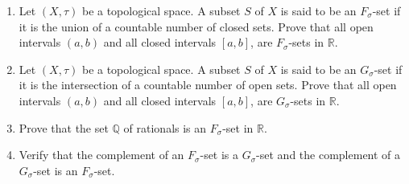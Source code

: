 \begin{exercise}
	\begin{enumerate}[label={(\roman*)}]
		\item Let $(X, \tau)$ be a topological space. A subset $S$ of $X$ is said to be an {\color{red}$F_{\sigma}$-set} if it is the union of a countable number of closed sets. Prove that all open intervals $(a, b)$ and all closed intervals $[a, b]$, are $F_{\sigma}$-sets in $\mathbb{R}$.
		\item Let $(X, \tau)$ be a topological space. A subset $S$ of $X$ is said to be an {\color{red}$G_{\sigma}$-set} if it is the intersection of a countable number of open sets. Prove that all open intervals $(a, b)$ and all closed intervals $[a, b]$, are $G_{\sigma}$-sets in $\mathbb{R}$.
		\item Prove that the set $\mathbb{Q}$ of rationals is an $F_{\sigma}$-set in $\mathbb{R}$.
		\item Verify that the complement of an $F_{\sigma}$-set is a $G_{\sigma}$-set and the complement of a $G_{\sigma}$-set is an $F_{\sigma}$-set.
	\end{enumerate}
\end{exercise}

